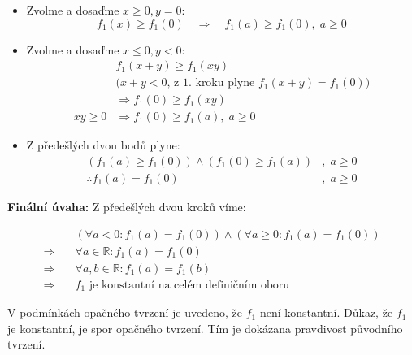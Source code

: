 \documentclass[12pt]{article}
\begin{document}
\begin{enumerate}
\begin{enumerate}
        \begin{itemize}
          \item Zvolme a dosaďme $x\geq0,y=0$: 
          \[f_1(x) \geq f_1(0) \quad \Rightarrow \quad f_1(a) \geq f_1(0), \; a\geq0
          \]

          \item Zvolme a dosaďme $x\leq0,y<0$: 
          \begin{align*}
            &f_1(x+y) \geq f_1(xy) \\
            &\text{($x+y<0$, z 1. kroku plyne $f_1(x+y) = f_1(0)$)} \\
            &\Rightarrow f_1(0) \geq f_1(xy)\\
            xy\geq0 &\Rightarrow f_1(0) \geq f_1(a), \; a\geq0
          \end{align*}

          \item Z předešlých dvou bodů plyne:
          \begin{align*}
            ( f_1(a) \geq f_1(0) ) \land ( f_1(0) \geq f_1(a) )&, \; a\geq0 \\
            \therefore f_1(a) = f_1(0)&, \; a\geq0
          \end{align*}
        \end{itemize}

        \medskip
        \textbf{Finální úvaha:}
          Z předešlých dvou kroků víme:

          \begin{align*}
            &(\forall a<0: f_1(a) = f_1(0)) \land (\forall a\geq0: f_1(a) = f_1(0)) \\
            \Rightarrow \quad &\forall a \in \mathbb{R}: f_1(a) = f_1(0) \\
            \Rightarrow \quad &\forall a,b \in \mathbb{R}: f_1(a) = f_1(b) \\
            \Rightarrow \quad &\text{$f_1$ je konstantní na celém definičním oboru}
          \end{align*}

          V podmínkách opačného tvrzení je uvedeno, že $f_1$ není konstantní.
          Důkaz, že $f_1$ je konstantní, je spor opačného tvrzení.
          Tím je dokázana pravdivost původního tvrzení.
    
    \end{enumerate}
  










\end{enumerate}
\end{document}
